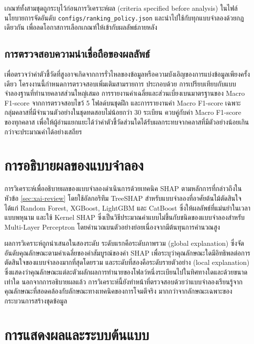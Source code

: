 เกณฑ์ทั้งสามชุดถูกระบุไว้ก่อนการวิเคราะห์ผล (criteria specified before analysis) ในไฟล์นโยบายการจัดอันดับ \texttt{configs/ranking\_policy.json} และนำไปใช้กับทุกแบบจำลองด้วยกฎเดียวกัน เพื่อลดโอกาสการเลือกเกณฑ์ให้เข้ากับผลลัพธ์ภายหลัง

\subsection{การตรวจสอบความน่าเชื่อถือของผลลัพธ์}

เพื่อตรวจว่าค่าตัวชี้วัดที่สูงอาจเกิดจากการรั่วไหลของข้อมูลหรือความบังเอิญของการแบ่งข้อมูลเพียงครั้งเดียว โครงงานนี้กำหนดการตรวจสอบเพิ่มเติมสามรายการ ประกอบด้วย การเปรียบเทียบกับแบบจำลองฐานที่ทำนายคลาสส่วนใหญ่เสมอ การรายงานค่าเฉลี่ยและส่วนเบี่ยงเบนมาตรฐานของ Macro F1-score จากการตรวจสอบไขว้ 5 โฟลด์บนชุดฝึก และการรายงานค่า Macro F1-score เฉพาะกลุ่มคลาสที่มีจำนวนตัวอย่างในชุดทดสอบไม่น้อยกว่า 30 ระเบียน ควบคู่กับค่า Macro F1-score ของทุกคลาส เพื่อให้ผู้อ่านแยกแยะได้ว่าค่าตัวชี้วัดส่วนใดได้รับผลกระทบจากคลาสที่มีตัวอย่างน้อยเกินกว่าจะประมาณค่าได้อย่างเสถียร

\section{การอธิบายผลของแบบจำลอง}
\label{sec:shap}

การวิเคราะห์เพื่ออธิบายผลของแบบจำลองดำเนินการด้วยเทคนิค SHAP ตามหลักการที่กล่าวถึงในหัวข้อ \ref{sec:xai-review} โดยใช้อัลกอริทึม TreeSHAP สำหรับแบบจำลองที่อาศัยต้นไม้ตัดสินใจ ได้แก่ Random Forest, XGBoost, LightGBM และ CatBoost ซึ่งให้ผลลัพธ์ที่แม่นยำในเวลาแบบพหุนาม \cite{lundberg2020treeshap} และใช้ Kernel SHAP ซึ่งเป็นวิธีประมาณค่าแบบไม่ขึ้นกับชนิดของแบบจำลองสำหรับ Multi-Layer Perceptron โดยคำนวณบนตัวอย่างย่อยเนื่องจากมีต้นทุนการคำนวณสูง

ผลการวิเคราะห์ถูกนำเสนอในสองระดับ ระดับแรกคือระดับภาพรวม (global explanation) ซึ่งจัดอันดับคุณลักษณะตามค่าเฉลี่ยของค่าสัมบูรณ์ของค่า SHAP เพื่อระบุว่าคุณลักษณะใดมีอิทธิพลต่อการตัดสินใจของแบบจำลองมากที่สุดโดยรวม และระดับที่สองคือระดับรายตัวอย่าง (local explanation) ซึ่งแสดงว่าคุณลักษณะแต่ละตัวผลักผลการทำนายของโฟลว์หนึ่งระเบียนไปในทิศทางใดและด้วยขนาดเท่าใด นอกจากการอธิบายผลแล้ว การวิเคราะห์นี้ยังทำหน้าที่ตรวจสอบด้วยว่าแบบจำลองเรียนรู้จากคุณลักษณะที่สอดคล้องกับลักษณะทางเทคนิคของการโจมตีจริง มากกว่าจากลักษณะเฉพาะของกระบวนการสร้างชุดข้อมูล

\section{การแสดงผลและระบบต้นแบบ}

